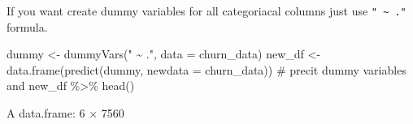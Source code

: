 \documentclass[
  letterpaper,
  DIV=11,
  numbers=noendperiod]{scrreprt}
\newenvironment{Shaded}{\begin{snugshade}}{\end{snugshade}}
\newcommand{\AttributeTok}[1]{\textcolor[rgb]{0.40,0.45,0.13}{#1}}
\newcommand{\CommentTok}[1]{\textcolor[rgb]{0.37,0.37,0.37}{#1}}
\newcommand{\FunctionTok}[1]{\textcolor[rgb]{0.28,0.35,0.67}{#1}}
\newcommand{\NormalTok}[1]{\textcolor[rgb]{0.00,0.23,0.31}{#1}}
\newcommand{\OtherTok}[1]{\textcolor[rgb]{0.00,0.23,0.31}{#1}}
\newcommand{\SpecialCharTok}[1]{\textcolor[rgb]{0.37,0.37,0.37}{#1}}
\newcommand{\StringTok}[1]{\textcolor[rgb]{0.13,0.47,0.30}{#1}}
\begin{document}
If you want create dummy variables for all categoriacal columns just use
\texttt{"\ \textasciitilde{}\ ."} formula.

\begin{Shaded}
\begin{Highlighting}[]
\NormalTok{dummy }\OtherTok{\textless{}{-}} \FunctionTok{dummyVars}\NormalTok{(}\StringTok{" \textasciitilde{} ."}\NormalTok{, }\AttributeTok{data =}\NormalTok{ churn\_data)}
\NormalTok{new\_df }\OtherTok{\textless{}{-}} \FunctionTok{data.frame}\NormalTok{(}\FunctionTok{predict}\NormalTok{(dummy, }\AttributeTok{newdata =}\NormalTok{ churn\_data)) }\CommentTok{\# precit dummy variables and}
\NormalTok{new\_df }\SpecialCharTok{\%\textgreater{}\%} \FunctionTok{head}\NormalTok{()}
\end{Highlighting}
\end{Shaded}

A data.frame: 6 × 7560
\end{document}
